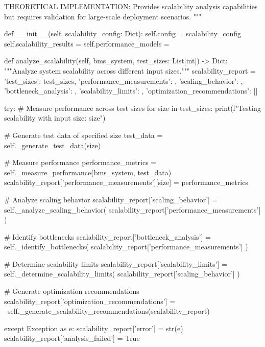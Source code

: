    THEORETICAL IMPLEMENTATION: Provides scalability analysis capabilities
    but requires validation for large-scale deployment scenarios.
    """
    
    def __init__(self, scalability_config: Dict):
        self.config = scalability_config
        self.scalability_results = {}
        self.performance_models = {}
        
    def analyze_scalability(self, bms_system, test_sizes: List[int]) -> Dict:
        """Analyze system scalability across different input sizes."""
        scalability_report = {
            'test_sizes': test_sizes,
            'performance_measurements': {},
            'scaling_behavior': {},
            'bottleneck_analysis': {},
            'scalability_limits': {},
            'optimization_recommendations': []
        }
        
        try:
            \# Measure performance across test sizes
            for size in test_sizes:
                print(f"Testing scalability with input size: {size}")
                
                \# Generate test data of specified size
                test_data = self._generate_test_data(size)
                
                \# Measure performance
                performance_metrics = self._measure_performance(bms_system, test_data)
                scalability_report['performance_measurements'][size] = performance_metrics
                
            \# Analyze scaling behavior
            scalability_report['scaling_behavior'] = self._analyze_scaling_behavior(
                scalability_report['performance_measurements']
            )
            
            \# Identify bottlenecks
            scalability_report['bottleneck_analysis'] = self._identify_bottlenecks(
                scalability_report['performance_measurements']
            )
            
            \# Determine scalability limits
            scalability_report['scalability_limits'] = self._determine_scalability_limits(
                scalability_report['scaling_behavior']
            )
            
            \# Generate optimization recommendations
            scalability_report['optimization_recommendations'] = \
                self._generate_scalability_recommendations(scalability_report)
                
        except Exception as e:
            scalability_report['error'] = str(e)
            scalability_report['analysis_failed'] = True
            
